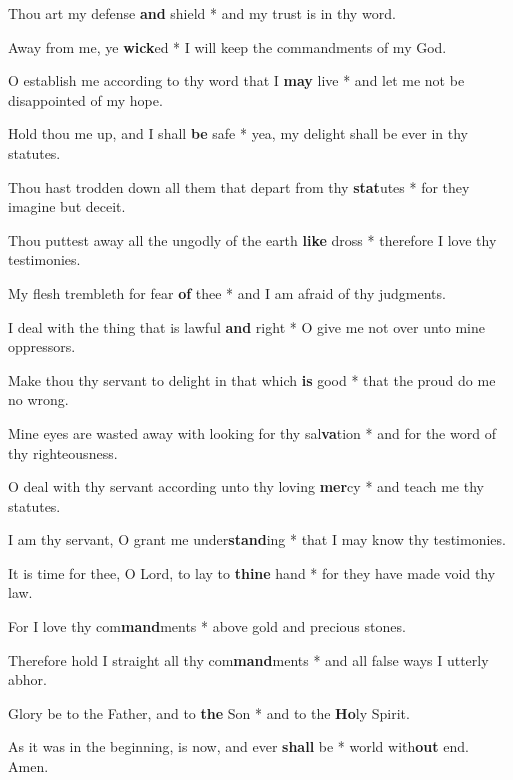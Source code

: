 \begin{multicols}{2}
	Thou art my defense \textbf{and} shield * and my trust is in thy word.
	
	Away from me, ye \textbf{wick}ed * I will keep the commandments of my God.
	
	O establish me according to thy word that I \textbf{may} live * and let me not be disappointed of my hope.
	
	Hold thou me up, and I shall \textbf{be} safe * yea, my delight shall be ever in thy statutes.
	
	Thou hast trodden down all them that depart from thy \textbf{stat}utes * for they imagine but deceit.
	
	Thou puttest away all the ungodly of the earth \textbf{like} dross * therefore I love thy testimonies.
	
	My flesh trembleth for fear \textbf{of} thee * and I am afraid of thy judgments.
	
	I deal with the thing that is lawful \textbf{and} right * O give me not over unto mine oppressors.
	
	Make thou thy servant to delight in that which \textbf{is} good * that the proud do me no wrong.
	
	Mine eyes are wasted away with looking for thy sal\textbf{va}tion * and for the word of thy righteousness.
	
	O deal with thy servant according unto thy loving \textbf{mer}cy * and teach me thy statutes.
	
	I am thy servant, O grant me under\textbf{stand}ing * that I may know thy testimonies.
	
	It is time for thee, O Lord, to lay to \textbf{thine} hand * for they have made void thy law.
	
	For I love thy com\textbf{mand}ments * above gold and precious stones.
	
	Therefore hold I straight all thy com\textbf{mand}ments * and all false ways I utterly abhor. 
	
	Glory be to the Father, and to \textbf{the} Son * and to the \textbf{Ho}ly Spirit.
	
	As it was in the beginning, is now, and ever \textbf{shall} be * world with\textbf{out} end. Amen.
\end{multicols}